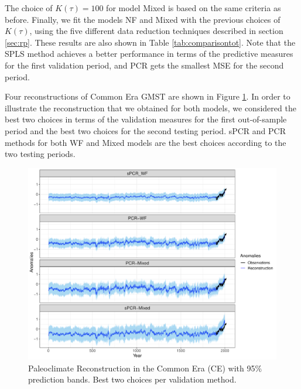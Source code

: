 \documentclass[12pt]{amsart}
\theoremstyle{plain}
\theoremstyle{definition}
\theoremstyle{remark}
\newcommand{\lb}[1]{\color{MidnightBlue}\textbf{[LB: #1]}\normalcolor}
\newcommand{\jeg}[1]{\color{ProcessBlue}\textbf{[JEG: #1]}\normalcolor}
\begin{document}
  The choice of $K(\tau)=100$ for model Mixed is
based on the same criteria as before. Finally, we fit the models NF and Mixed
with the previous choices of $K(\tau)$, using the five different data reduction
techniques described in section \ref{sec:rp}. These results are
also shown in Table \ref{tab:comparisontot}. Note that the SPLS method achieves a better performance in terms of the
predictive measures for the first validation period, and PCR gets the smallest
MSE for the second period. 

 Four reconstructions of Common Era GMST
are shown in Figure \ref{fig:paleoCE1}.
In order to illustrate the reconstruction that we obtained for both models, we considered the best two choices in terms of the validation measures for the
first out-of-sample period  and the best two choices for the second testing
period. sPCR and PCR methods for both WF and Mixed models are the best choices
according to the two testing periods.

\begin{figure}
  \centering
  \includegraphics[scale=0.55]{RecCE_Final}
  \caption{Paleoclimate Reconstruction in the Common Era (CE) with 95\%
    prediction bands. Best two choices per validation method.}
  \label{fig:paleoCE1}
\end{figure}

\end{document}
